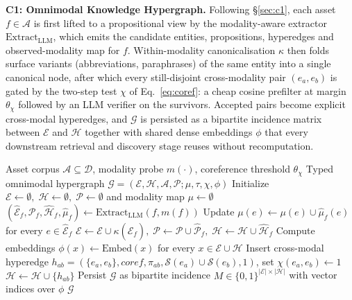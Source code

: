 \documentclass{article}
\begin{document}
\textbf{C1: Omnimodal Knowledge Hypergraph.} Following \S\ref{sec:c1}, each asset $f\!\in\!\mathcal{A}$ is first lifted to a propositional view by the modality-aware extractor $\mathrm{Extract}_{\mathrm{LLM}}$, which emits the candidate entities, propositions, hyperedges and observed-modality map for $f$. Within-modality canonicalisation $\kappa$ then folds surface variants (abbreviations, paraphrases) of the same entity into a single canonical node, after which every still-disjoint cross-modality pair $(e_a,e_b)$ is gated by the two-step test $\chi$ of Eq.~\eqref{eq:coref}: a cheap cosine prefilter at margin $\theta_{\chi}$ followed by an LLM verifier on the survivors. Accepted pairs become explicit cross-modal hyperedges, and $\mathcal{G}$ is persisted as a bipartite incidence matrix between $\mathcal{E}$ and $\mathcal{H}$ together with shared dense embeddings $\phi$ that every downstream retrieval and discovery stage reuses without recomputation.

\begin{algorithm}[h!t]
\small
\caption{C1 --- Omnimodal Knowledge Hypergraph Construction}
\label{alg:kc-c1}
\begin{algorithmic}[1]
\REQUIRE Asset corpus $\mathcal{A}\!\subseteq\!\mathcal{D}$, modality probe $m(\cdot)$, coreference threshold $\theta_{\chi}$
\ENSURE Typed omnimodal hypergraph $\mathcal{G}\!=\!(\mathcal{E},\mathcal{H},\mathcal{A},\mathcal{P};\mu,\tau,\chi,\phi)$
\STATE Initialize $\mathcal{E}\!\leftarrow\!\emptyset,\;\mathcal{H}\!\leftarrow\!\emptyset,\;\mathcal{P}\!\leftarrow\!\emptyset$ and modality map $\mu\!\leftarrow\!\emptyset$
    \STATE $(\hat{\mathcal{E}}_f,\hat{\mathcal{P}}_f,\hat{\mathcal{H}}_f,\hat{\mu}_f)\!\leftarrow\!\mathrm{Extract}_{\mathrm{LLM}}(f,m(f))$ \hfill {}
    \STATE Update $\mu(e)\!\leftarrow\!\mu(e)\!\cup\!\hat{\mu}_f(e)$ for every $e\!\in\!\hat{\mathcal{E}}_f$
    \STATE $\mathcal{E}\!\leftarrow\!\mathcal{E}\!\cup\!\kappa(\hat{\mathcal{E}}_f),\;\mathcal{P}\!\leftarrow\!\mathcal{P}\!\cup\!\hat{\mathcal{P}}_f,\;\mathcal{H}\!\leftarrow\!\mathcal{H}\!\cup\!\hat{\mathcal{H}}_f$
\ENDFOR
\STATE Compute embeddings $\phi(x)\!\leftarrow\!\mathrm{Embed}(x)$ for every $x\!\in\!\mathcal{E}\!\cup\!\mathcal{H}$
        \STATE Insert cross-modal hyperedge $h_{ab}\!=\!(\{e_a,e_b\},\textit{coref},\pi_{ab},\mathcal{S}(e_a)\!\cup\!\mathcal{S}(e_b),1)$, set $\chi(e_a,e_b)\!\leftarrow\!1$ \hfill {}
        \STATE $\mathcal{H}\!\leftarrow\!\mathcal{H}\!\cup\!\{h_{ab}\}$
    \ENDIF
\ENDFOR
\STATE Persist $\mathcal{G}$ as bipartite incidence $M\!\in\!\{0,1\}^{|\mathcal{E}|\times|\mathcal{H}|}$ with vector indices over $\phi$
\RETURN $\mathcal{G}$
\end{algorithmic}
\end{algorithm}
\end{document}
